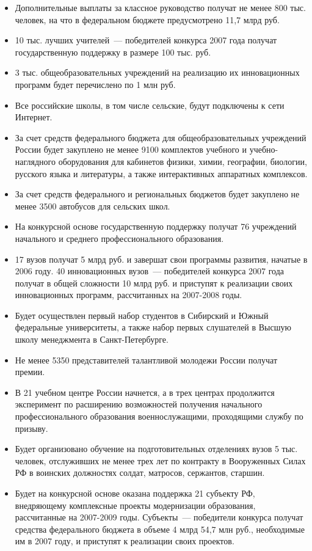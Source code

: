 \documentclass[article, 12pt, russian, oneside]{ncc}
\begin{document}
\begin{itemize}
\item Дополнительные выплаты за классное руководство получат не менее
  800 тыс. человек, на что в федеральном бюджете предусмотрено 11,7
  млрд руб.
\item 10 тыс. лучших учителей~--- победителей конкурса 2007 года
  получат государственную поддержку в размере 100 тыс. руб.
\item 3 тыс. общеобразовательных учреждений на реализацию их
  инновационных программ будет перечислено по 1 млн руб.
\item Все российские школы, в том числе сельские, будут подключены к
  сети Интернет.
\item За счет средств федерального бюджета для общеобразовательных
  учреждений России будет закуплено не менее 9100 комплектов учебного
  и учебно-наглядного оборудования для кабинетов физики, химии,
  географии, биологии, русского языка и литературы, а также
  интерактивных аппаратных комплексов.
\item За счет средств федерального и региональных бюджетов будет
  закуплено не менее 3500 автобусов для сельских школ.
\item На конкурсной основе государственную поддержку получат 76
  учреждений начального и среднего профессионального образования.
\item 17 вузов получат 5 млрд руб. и завершат свои программы развития,
  начатые в 2006 году. 40 инновационных вузов~--- победителей конкурса
  2007 года получат в общей сложности 10 млрд руб. и приступят к
  реализации своих инновационных программ, рассчитанных на 2007-2008
  годы.
\item Будет осуществлен первый набор студентов в Сибирский и Южный
  федеральные университеты, а также набор первых слушателей в Высшую
  школу менеджмента в Санкт-Петербурге.
\item Не менее 5350 представителей талантливой молодежи России получат
  премии.
\item В 21 учебном центре России начнется, а в трех центрах
  продолжится эксперимент по расширению возможностей получения
  начального профессионального образования военнослужащими,
  проходящими службу по призыву.
\item Будет организовано обучение на подготовительных отделениях вузов
  5 тыс. человек, отслуживших не менее трех лет по контракту в
  Вооруженных Силах РФ в воинских должностях солдат, матросов,
  сержантов, старшин.
\item Будет на конкурсной основе оказана поддержка 21 субъекту РФ,
  внедряющему комплексные проекты модернизации образования,
  рассчитанные на 2007-2009 годы. Субъекты~--- победители конкурса
  получат средства федерального бюджета в объеме 4 млрд 54,7 млн руб.,
  необходимые им в 2007 году, и приступят к реализации своих проектов.
\end{itemize}
\end{document}
